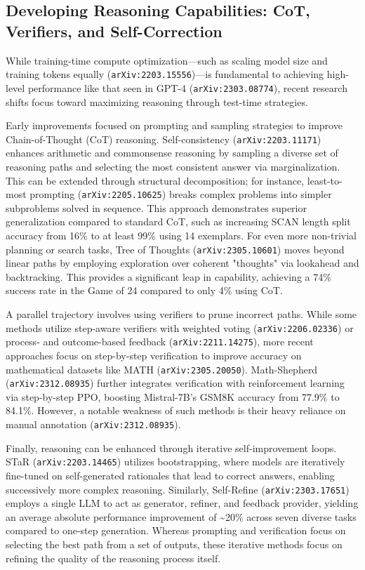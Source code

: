 \documentclass[11pt]{article}
\begin{document}
\subsection{Developing Reasoning Capabilities: CoT, Verifiers, and Self-Correction}

While training-time compute optimization—such as scaling model size and training tokens equally (\texttt{arXiv:2203.15556})—is fundamental to achieving high-level performance like that seen in GPT-4 (\texttt{arXiv:2303.08774}), recent research shifts focus toward maximizing reasoning through test-time strategies.

Early improvements focused on prompting and sampling strategies to improve Chain-of-Thought (CoT) reasoning. Self-consistency (\texttt{arXiv:2203.11171}) enhances arithmetic and commonsense reasoning by sampling a diverse set of reasoning paths and selecting the most consistent answer via marginalization. This can be extended through structural decomposition; for instance, least-to-most prompting (\texttt{arXiv:2205.10625}) breaks complex problems into simpler subproblems solved in sequence. This approach demonstrates superior generalization compared to standard CoT, such as increasing SCAN length split accuracy from 16\% to at least 99\% using 14 exemplars. For even more non-trivial planning or search tasks, Tree of Thoughts (\texttt{arXiv:2305.10601}) moves beyond linear paths by employing exploration over coherent "thoughts" via lookahead and backtracking. This provides a significant leap in capability, achieving a 74\% success rate in the Game of 24 compared to only 4\% using CoT.

A parallel trajectory involves using verifiers to prune incorrect paths. While some methods utilize step-aware verifiers with weighted voting (\texttt{arXiv:2206.02336}) or process- and outcome-based feedback (\texttt{arXiv:2211.14275}), more recent approaches focus on step-by-step verification to improve accuracy on mathematical datasets like MATH (\texttt{arXiv:2305.20050}). Math-Shepherd (\texttt{arXiv:2312.08935}) further integrates verification with reinforcement learning via step-by-step PPO, boosting Mistral-7B's GSM8K accuracy from 77.9\% to 84.1\%. However, a notable weakness of such methods is their heavy reliance on manual annotation (\texttt{arXiv:2312.08935}).

Finally, reasoning can be enhanced through iterative self-improvement loops. STaR (\texttt{arXiv:2203.14465}) utilizes bootstrapping, where models are iteratively fine-tuned on self-generated rationales that lead to correct answers, enabling successively more complex reasoning. Similarly, Self-Refine (\texttt{arXiv:2303.17651}) employs a single LLM to act as generator, refiner, and feedback provider, yielding an average absolute performance improvement of \textasciitilde{}20\% across seven diverse tasks compared to one-step generation. Whereas prompting and verification focus on selecting the best path from a set of outputs, these iterative methods focus on refining the quality of the reasoning process itself.
\end{document}
